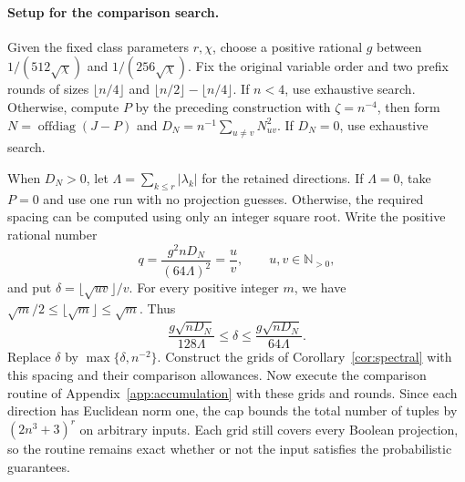 \documentclass[11pt,a4paper]{article}
\theoremstyle{definition}
\theoremstyle{remark}
\begin{document}
\paragraph{Setup for the comparison search.}
Given the fixed class parameters $r,\chi$, choose a positive rational
$g$ between $1/(512\sqrt\chi)$ and $1/(256\sqrt\chi)$.
Fix the original variable order and two prefix rounds of sizes
$\lfloor n/4\rfloor$ and
$\lfloor n/2\rfloor-\lfloor n/4\rfloor$. If $n<4$, use exhaustive
search. Otherwise, compute $P$ by the preceding construction with
$\zeta=n^{-4}$, then form
$N=\operatorname{offdiag}(J-P)$ and
$D_N=n^{-1}\sum_{u\ne v}N_{uv}^2$.
If $D_N=0$, use exhaustive search.

When $D_N>0$, let $\Lambda=\sum_{k\le r}|\lambda_k|$ for the retained
directions. If $\Lambda=0$, take $P=0$ and use one run with no projection
guesses. Otherwise, the required spacing can be computed using only an
integer square root. Write the positive rational number
\[
 q=\frac{g^2nD_N}{(64\Lambda)^2}=\frac{u}{v},\qquad u,v\in\mathbb N_{>0},
\]
and put $\delta=\lfloor\sqrt{uv}\rfloor/v$. For every positive integer
$m$, we have $\sqrt m/2\le\lfloor\sqrt m\rfloor\le\sqrt m$. Thus
\begin{equation}
 \frac{g\sqrt{nD_N}}{128\Lambda}\le\delta
 \le\frac{g\sqrt{nD_N}}{64\Lambda}.\label{eq:discovery-spacing}
\end{equation}
Replace $\delta$ by $\max\{\delta,n^{-2}\}$. Construct the grids of
Corollary~\ref{cor:spectral} with this spacing and their comparison
allowances. Now execute the comparison routine of
Appendix~\ref{app:accumulation} with these grids and rounds.
Since each direction has Euclidean norm one, the cap bounds the total
number of tuples by $(2n^3+3)^r$ on arbitrary inputs. Each grid still
covers every Boolean projection, so
the routine remains exact whether or not the input satisfies the
probabilistic guarantees.
\end{document}
